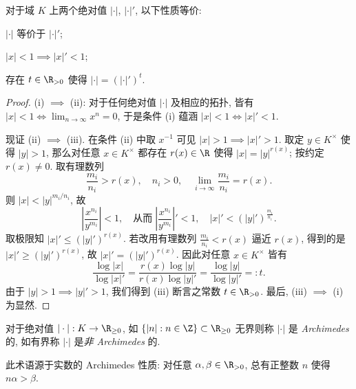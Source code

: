 \begin{lemma}\label{prop:abs-equivalence}
	对于域 $K$ 上两个绝对值 $|\cdot|$, $|\cdot|'$, 以下性质等价:
	\begin{compactenum}[(i)]
		\item $|\cdot|$ 等价于 $|\cdot|'$;
		\item $|x| < 1 \implies |x|' < 1$;
		\item 存在 $t \in \R_{> 0}$ 使得 $|\cdot| = (|\cdot|')^t$.
	\end{compactenum}
\end{lemma}
\begin{proof}
	(i) $\implies$ (ii): 对于任何绝对值 $|\cdot|$ 及相应的拓扑, 皆有 $|x| < 1 \iff \lim_{n \to \infty} x^n = 0$, 于是条件 (i) 蕴涵 $|x| < 1 \iff |x|' < 1$.
	
	现证 (ii) $\implies$ (iii). 在条件 (ii) 中取 $x^{-1}$ 可见 $|x| > 1 \implies |x|' > 1$. 取定 $y \in K^\times$ 使得 $|y|>1$, 那么对任意 $x \in K^\times$ 都存在 $r(x) \in \R$ 使得 $|x|=|y|^{r(x)}$; 按约定 $r(x) \neq 0$. 取有理数列
	\[ \frac{m_i}{n_i} > r(x), \quad n_i > 0, \quad \lim_{i \to \infty} \frac{m_i}{n_i} = r(x). \]
	则 $|x| < |y|^{m_i/n_i}$, 故
	\[ \left| \frac{x^{n_i}}{y^{m_i}} \right| < 1, \quad \text{从而}\; \left| \frac{x^{n_i}}{y^{m_i}} \right|' < 1, \quad |x|' < (|y|')^{\frac{m_i}{n_i}}. \]
	取极限知 $|x|' \leq (|y|')^{r(x)}$. 若改用有理数列 $\frac{m_i}{n_i} < r(x)$ 逼近 $r(x)$, 得到的是 $|x|' \geq (|y|')^{r(x)}$, 故 $|x|' = (|y|')^{r(x)}$. 因此对任意 $x \in K^\times$ 皆有
	\[ \frac{\log|x|}{\log|x|'} = \frac{r(x) \log|y|}{r(x) \log|y|'} = \frac{\log|y|}{\log|y|'} =: t. \]
	由于 $|y| > 1 \implies |y|' > 1$, 我们得到 (iii) 断言之常数 $t \in \R_{>0}$. 最后, (iii) $\implies$ (i) 为显然.
\end{proof}

\begin{definition}
	对于绝对值 $|\cdot|: K \to \R_{\geq 0}$, 如 $\{ |n|: n \in \Z\} \subset \R_{\geq 0}$ 无界则称 $|\cdot|$ 是 \emph{Archimedes} 的, 如有界称 $|\cdot|$ 是\emph{非 Archimedes} 的.
\end{definition}
此术语源于实数的 Archimedes 性质: 对任意 $\alpha,\beta \in \R_{> 0}$, 总有正整数 $n$ 使得 $n\alpha > \beta$.

